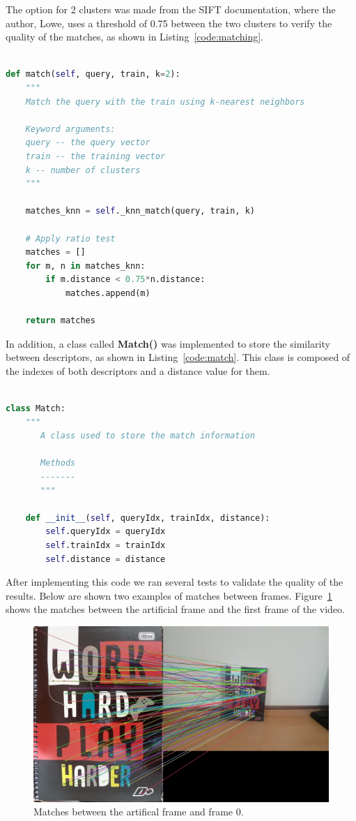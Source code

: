\documentclass[]{IEEEtran}
\begin{document}
The option for 2 clusters was made from the SIFT documentation, where the author, Lowe, uses a threshold of 0.75 between the two clusters to verify the quality of the matches, as shown in Listing~\ref{code:matching}.

\begin{lstlisting}[language=Python, caption={Matching Lowe's Criteria}, label={code:matching}]

def match(self, query, train, k=2):
    """
    Match the query with the train using k-nearest neighbors

    Keyword arguments:
    query -- the query vector
    train -- the training vector
    k -- number of clusters
    """

    matches_knn = self._knn_match(query, train, k)

    # Apply ratio test
    matches = []
    for m, n in matches_knn:
        if m.distance < 0.75*n.distance:
            matches.append(m)

    return matches

\end{lstlisting}

In addition, a class called \textbf{Match()} was implemented to store the similarity between descriptors, as shown in Listing~\ref{code:match}. This class is composed of the indexes of both descriptors and a distance value for them.

\begin{lstlisting}[language=Python, caption={Match Class}, label={code:match}]

class Match:
    """
       A class used to store the match information

       Methods
       -------
       """

    def __init__(self, queryIdx, trainIdx, distance):
        self.queryIdx = queryIdx
        self.trainIdx = trainIdx
        self.distance = distance

\end{lstlisting}

After implementing this code we ran several tests to validate the quality of the results. Below are shown two examples of matches between frames. Figure~\ref{fig:matches_0} shows the matches between the artificial frame and the first frame of the video.

\begin{figure}[H]
     \centering
     \includegraphics[width=0.9\hsize]{img/matches_0.jpg}
     \caption{Matches between the artifical frame and frame 0.}
     \label{fig:matches_0}
\end{figure}
\end{document}
